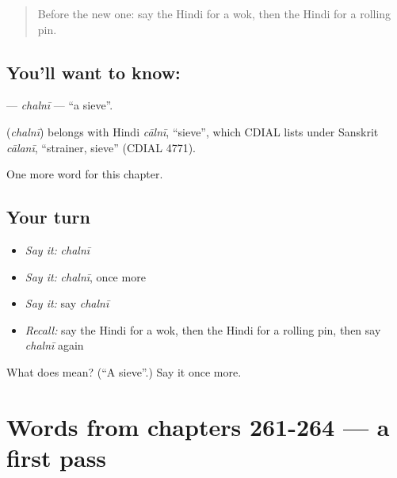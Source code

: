 \label{lesson:HI-C269-chalni}



\begin{quote}
Before the new one: say the Hindi for a wok, then the Hindi for a rolling pin.
\end{quote}

\subsection*{You'll want to know: }
\textbf{} — \emph{chalnī} — \textquotedblleft{}a sieve\textquotedblright{}.

\begin{cousinweb}
\textbf{} (\emph{chalnī}) belongs with Hindi \emph{cālnī}, \textquotedblleft{}sieve\textquotedblright{}, which CDIAL lists under Sanskrit \emph{cālanī}, \textquotedblleft{}strainer, sieve\textquotedblright{} (CDIAL 4771).
\end{cousinweb}

\begin{grammarlens}[title={What you've built}]
One more word for this chapter.
\end{grammarlens}

\subsection*{Your turn}
\begin{itemize}
\raggedright
  \item \emph{Say it:} \emph{chalnī}
  \item \emph{Say it:} \emph{chalnī}, once more
  \item \emph{Say it:} say \emph{chalnī}
  \item \emph{Recall:} say the Hindi for a wok, then the Hindi for a rolling pin, then say \emph{chalnī} again
\end{itemize}

\begin{tcolorbox}[breakable,colback=teal!4,colframe=teal!35!black,title={Before you move on}]
What does  mean? (\textquotedblleft{}A sieve\textquotedblright{}.) Say it once more.
\end{tcolorbox}
\section[(dialogue)]{Words from chapters 261-264 — a first pass}

\label{lesson:HI-R269-first-pass-words-from-chapters-261-264}



